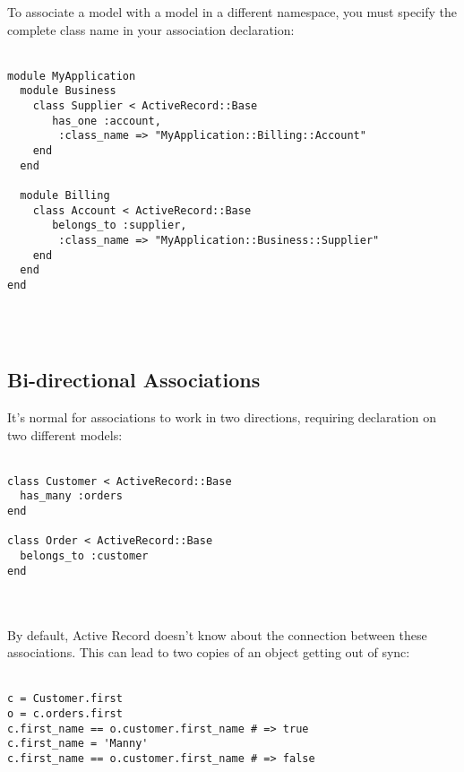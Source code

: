 \documentclass[10pt]{book}
\begin{document}
To associate a model with a model in a different namespace, you must  specify the complete class name in your association declaration:
\\ \\
\begin{minipage}{\textwidth}{\scriptsize
\begin{verbatim}
module MyApplication
  module Business
    class Supplier < ActiveRecord::Base
       has_one :account,
        :class_name => "MyApplication::Billing::Account"
    end
  end
 
  module Billing
    class Account < ActiveRecord::Base
       belongs_to :supplier,
        :class_name => "MyApplication::Business::Supplier"
    end
  end
end
\end{verbatim}}
\end{minipage}
\\ \\

\subsection{ Bi-directional Associations}

It’s normal for associations to work in two directions, requiring declaration on two different models:
\\ \\
\begin{minipage}{\textwidth}{\scriptsize
\begin{verbatim}
class Customer < ActiveRecord::Base
  has_many :orders
end
 
class Order < ActiveRecord::Base
  belongs_to :customer
end
\end{verbatim}}
\end{minipage}
\\ \\

By default, Active Record doesn’t know about the connection between  these associations. This can lead to two copies of an object getting out  of sync:
\\ \\
\begin{minipage}{\textwidth}{\scriptsize
\begin{verbatim}
c = Customer.first
o = c.orders.first
c.first_name == o.customer.first_name # => true
c.first_name = 'Manny'
c.first_name == o.customer.first_name # => false
\end{verbatim}}
\end{minipage}
\\ \\
\end{document}
